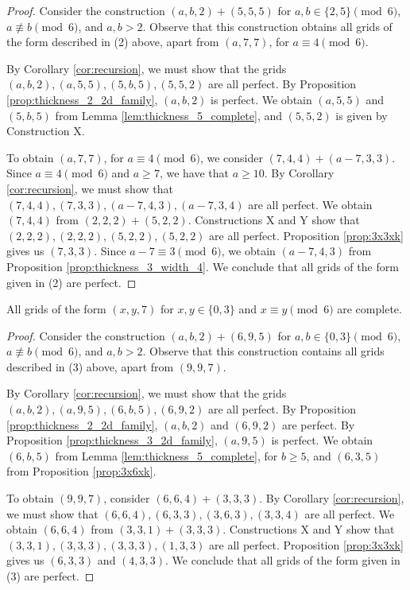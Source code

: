\begin{proof}
Consider the construction $(a,b,2) + (5,5,5)$ for $a,b \in \{2,5\} \pmod 6$, $a \not\equiv b \pmod 6$, and $a,b > 2$. Observe that this construction obtains all grids of the form described in (2) above, apart from $(a,7,7)$, for $a \equiv 4 \pmod 6$. 

By Corollary \ref{cor:recursion}, we must show that the grids $(a,b,2), (a,5,5), (5,b,5), (5,5,2)$ are all perfect. By Proposition \ref{prop:thickness_2_2d_family}, $(a,b,2)$ is perfect. We obtain $(a,5,5)$ and $(5,b,5)$ from Lemma \ref{lem:thickness_5_complete}, and $(5,5,2)$ is given by Construction X.

To obtain $(a,7,7)$, for $a \equiv 4 \pmod 6$, we consider $(7,4,4) + (a-7,3,3)$. Since $a \equiv 4 \pmod 6$ and $a \geq 7$, we have that $a \geq 10$. By Corollary \ref{cor:recursion}, we must show that $(7,4,4), (7,3,3), (a-7,4,3), (a-7,3,4)$ are all perfect. We obtain $(7,4,4)$ from $(2,2,2) + (5,2,2)$. Constructions X and Y show that $(2,2,2), (2,2,2), (5,2,2), (5,2,2)$ are all perfect. Proposition \ref{prop:3x3xk} gives us $(7,3,3)$. Since $a-7 \equiv 3 \pmod 6$, we obtain $(a-7,4,3)$ from Proposition \ref{prop:thickness_3_width_4}. We conclude that all grids of the form given in (2) are perfect. 
\end{proof}

\begin{lem}
\label{lem:thickness_7_case_3}
All grids of the form $(x,y,7)$ for $x,y \in \{0,3\}$ and $x \equiv y \pmod 6$ are complete.
\end{lem}

\begin{proof}
Consider the construction $(a,b,2) + (6,9,5)$ for $a,b \in \{0,3\} \pmod 6$, $a \not\equiv b \pmod 6$, and $a,b > 2$. Observe that this construction contains all grids described in (3) above, apart from $(9,9,7)$. 

By Corollary \ref{cor:recursion}, we must show that the grids $(a,b,2), (a,9,5), (6,b,5), (6,9,2)$ are all perfect. By Proposition \ref{prop:thickness_2_2d_family}, $(a,b,2)$ and $(6,9,2)$ are perfect. By Proposition \ref{prop:thickness_3_2d_family}, $(a,9,5)$ is perfect. We obtain $(6,b,5)$ from Lemma \ref{lem:thickness_5_complete}, for $b \geq 5$, and $(6,3,5)$ from Proposition \ref{prop:3x6xk}. 

To obtain $(9,9,7)$, consider $(6,6,4) + (3,3,3)$. By Corollary \ref{cor:recursion}, we must show that $(6,6,4), (6,3,3), (3,6,3), (3,3,4)$ are all perfect. We obtain $(6,6,4)$ from $(3,3,1) + (3,3,3)$. Constructions X and Y show that $(3,3,1), (3,3,3), (3,3,3), (1,3,3)$ are all perfect. Proposition \ref{prop:3x3xk} gives us $(6,3,3)$ and $(4,3,3)$. We conclude that all grids of the form given in (3) are perfect.
\end{proof}

